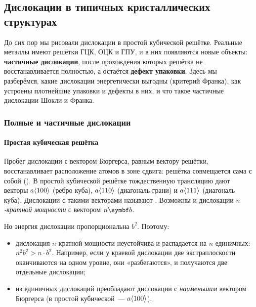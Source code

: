 \subsection{Дислокации в типичных кристаллических структурах}\label{ssec:disl-in-structures}

\begin{orientir}
До сих пор мы рисовали дислокации в простой кубической решётке. Реальные
металлы имеют решётки ГЦК, ОЦК и ГПУ, и в них появляются новые объекты:
\textbf{частичные дислокации}, после прохождения которых решётка не
восстанавливается полностью, а остаётся \textbf{дефект упаковки}. Здесь
мы разберёмся, какие дислокации энергетически выгодны (критерий
Франка), как устроены плотнейшие упаковки и дефекты в них, и что такое
частичные дислокации Шокли и Франка.
\end{orientir}

\subsubsection{Полные и частичные дислокации}

\paragraph{Простая кубическая решётка}
Пробег дислокации с вектором Бюргерса, равным вектору решётки,
восстанавливает расположение атомов в зоне сдвига: решётка совмещается
сама с собой (). В простой кубической
решётке тождественную трансляцию дают векторы $a\langle 100\rangle$ (ребро куба),
$a\langle 110\rangle$ (диагональ грани) и $a\langle 111\rangle$ (диагональ куба).
Дислокации с такими векторами называют . Возможны и
дислокации \emph{$n$-кратной мощности} с вектором $n\vb b$.

Но энергия дислокации пропорциональна $b^2$. Поэтому:
\begin{itemize}
\item дислокация $n$-кратной мощности неустойчива и распадается на $n$
единичных: $n^2b^2>n\cdot b^2$. Например, если у краевой дислокации две
экстраплоскости оканчиваются на одном уровне, они «разбегаются», и
получаются две отдельные дислокации;
\item из единичных дислокаций преобладают дислокации с \emph{наименьшим}
вектором Бюргерса (в простой кубической~— $a\langle 100\rangle$).
\end{itemize}

